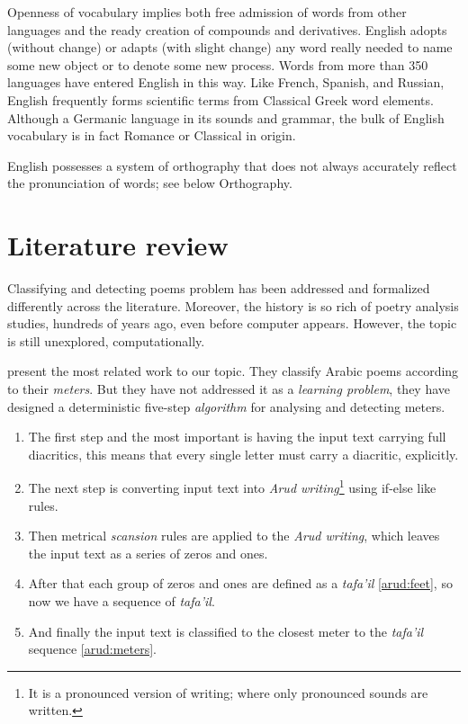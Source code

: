 \documentclass[12pt]{report}
\begin{document}
Openness of vocabulary implies both free admission of words from other languages
and the ready creation of compounds and derivatives. English adopts (without
change) or adapts (with slight change) any word really needed to name some new
object or to denote some new process. Words from more than 350 languages have
entered English in this way. Like French, Spanish, and Russian, English
frequently forms scientific terms from Classical Greek word elements. Although a
Germanic language in its sounds and grammar, the bulk of English vocabulary is in
fact Romance or Classical in origin.

English possesses a system of orthography that does not always accurately reflect
the pronunciation of words; see below Orthography.




\section{Literature review}


Classifying and detecting poems problem has been addressed and formalized
differently across the literature. Moreover, the history is so rich of poetry
analysis studies, hundreds of years ago, even before computer appears. However,
the topic is still unexplored, computationally. 


\citet{Abuata} present the most related work to our topic. They classify
Arabic poems according to their \textit{meters}.  But they have not addressed it
as a \textit{learning problem}, they have designed a deterministic
five-step \textit{algorithm} for analysing  and detecting meters. 


\begin{enumerate}
\item The first step and the most important is having the input text carrying
    full diacritics, this means that every single letter must carry a diacritic,
    explicitly.
\item The next step is converting input text into \textit{Arud
    writing}\footnote{It is a pronounced version of writing; where only pronounced
    sounds are written.} using if-else like rules.
\item Then metrical \textit{scansion} rules are applied to the \textit{Arud
    writing}, which leaves the input text as a series of zeros and ones. 
\item After that each group of zeros and ones are defined as a \textit{tafa'il}
    \ref{arud:feet}, so now we have a sequence of \textit{tafa'il}.

\item And finally  the input text is classified to the closest meter to the
    \textit{tafa'il} sequence \ref{arud:meters}.
\end{enumerate}
\end{document}
